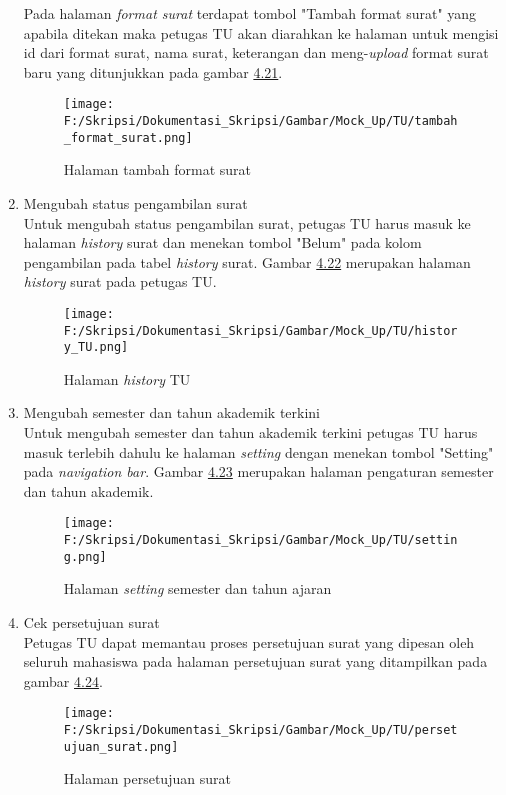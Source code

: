 \begin{enumerate}
	Pada halaman \textit{format surat} terdapat tombol "Tambah format surat" yang apabila ditekan maka petugas TU akan diarahkan ke halaman untuk mengisi id dari format surat, nama surat, keterangan dan meng-\textit{upload} format surat baru yang ditunjukkan pada gambar \hyperlink{halaman_tambah_format_surat}{4.21}.
	\begin{figure}[H]
	\centering
		\texttt{[image: F:/Skripsi/Dokumentasi\_Skripsi/Gambar/Mock\_Up/TU/tambah\_format\_surat.png]}
		\caption{Halaman tambah format surat}
		\label{fig:halaman_tambah_format_surat}
	\end{figure}
	
	\item Mengubah status pengambilan surat\\
	Untuk mengubah status pengambilan surat, petugas TU harus masuk ke halaman \textit{history} surat dan menekan tombol "Belum" pada kolom pengambilan pada tabel \textit{history} surat. Gambar \hyperlink{halaman_history_TU}{4.22} merupakan halaman \textit{history} surat pada petugas TU.
	\begin{figure}[H]
	\centering
		\texttt{[image: F:/Skripsi/Dokumentasi\_Skripsi/Gambar/Mock\_Up/TU/history\_TU.png]}
		\caption{Halaman \textit{history} TU}
		\label{fig:halaman_history_TU}
	\end{figure}
	
	\item Mengubah semester dan tahun akademik terkini \\
	Untuk mengubah semester dan tahun akademik terkini petugas TU harus masuk terlebih dahulu ke halaman \textit{setting} dengan menekan tombol "Setting" pada \textit{navigation bar}. Gambar \hyperlink{setting}{4.23} merupakan halaman pengaturan semester dan tahun akademik.
	\begin{figure}[H]
	\centering
		\texttt{[image: F:/Skripsi/Dokumentasi\_Skripsi/Gambar/Mock\_Up/TU/setting.png]}
		\caption{Halaman \textit{setting} semester dan tahun ajaran}
		\label{fig:setting}
	\end{figure}
	
	\item Cek persetujuan surat\\
	Petugas TU dapat memantau proses persetujuan surat yang dipesan oleh seluruh mahasiswa pada halaman persetujuan surat yang ditampilkan pada gambar \hyperlink{halaman_persetujuan_surat}{4.24}.
	\begin{figure}[H]
	\centering
		\texttt{[image: F:/Skripsi/Dokumentasi\_Skripsi/Gambar/Mock\_Up/TU/persetujuan\_surat.png]}
		\caption{Halaman persetujuan surat}
		\label{fig:halaman_persetujuan_surat}
	\end{figure}
\end{enumerate}
